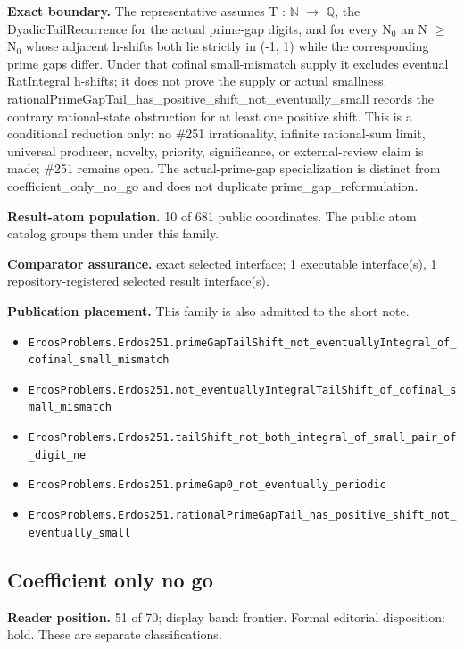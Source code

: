 \documentclass[11pt]{article}
\begin{document}
\textbf{Exact boundary.} The representative assumes T : \ensuremath{\mathbb{N}} \ensuremath{\to} \ensuremath{\mathbb{Q}}, the DyadicTailRecurrence for the actual prime-gap digits, and for every N\ensuremath{_{0}} an N \ensuremath{\ge} N\ensuremath{_{0}} whose adjacent h-shifts both lie strictly in (-1, 1) while the corresponding prime gaps differ. Under that cofinal small-mismatch supply it excludes eventual RatIntegral h-shifts; it does not prove the supply or actual smallness. rationalPrimeGapTail\_has\_positive\_shift\_not\_eventually\_small records the contrary rational-state obstruction for at least one positive shift. This is a conditional reduction only: no \#251 irrationality, infinite rational-sum limit, universal producer, novelty, priority, significance, or external-review claim is made; \#251 remains open. The actual-prime-gap specialization is distinct from coefficient\_only\_no\_go and does not duplicate prime\_gap\_reformulation.

\textbf{Result-atom population.} 10 of 681 public coordinates. The public atom catalog groups them under this family.

\textbf{Comparator assurance.} exact selected interface; 1 executable interface(s), 1 repository-registered selected result interface(s).

\textbf{Publication placement.} This family is also admitted to the short note.

\begin{itemize}
  \item \nolinkurl{ErdosProblems.Erdos251.primeGapTailShift_not_eventuallyIntegral_of_cofinal_small_mismatch}
  \item \nolinkurl{ErdosProblems.Erdos251.not_eventuallyIntegralTailShift_of_cofinal_small_mismatch}
  \item \nolinkurl{ErdosProblems.Erdos251.tailShift_not_both_integral_of_small_pair_of_digit_ne}
  \item \nolinkurl{ErdosProblems.Erdos251.primeGap0_not_eventually_periodic}
  \item \nolinkurl{ErdosProblems.Erdos251.rationalPrimeGapTail_has_positive_shift_not_eventually_small}
\end{itemize}

\subsection{Coefficient only no go}
\textbf{Reader position.} 51 of 70; display band: frontier.  Formal editorial disposition: hold.  These are separate classifications.
\end{document}
